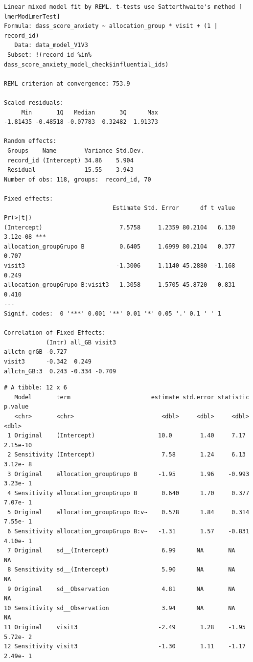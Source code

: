 \documentclass[
  letterpaper,
  DIV=11,
  numbers=noendperiod]{scrartcl}
\newenvironment{Shaded}{\begin{snugshade}}{\end{snugshade}}
\newcommand{\NormalTok}[1]{\textcolor[rgb]{0.00,0.23,0.31}{#1}}
\newcommand{\SpecialCharTok}[1]{\textcolor[rgb]{0.37,0.37,0.37}{#1}}
\begin{document}
\begin{verbatim}
Linear mixed model fit by REML. t-tests use Satterthwaite's method [
lmerModLmerTest]
Formula: dass_score_anxiety ~ allocation_group * visit + (1 | record_id)
   Data: data_model_V1V3
 Subset: !(record_id %in% dass_score_anxiety_model_check$influential_ids)

REML criterion at convergence: 753.9

Scaled residuals: 
     Min       1Q   Median       3Q      Max 
-1.81435 -0.48518 -0.07783  0.32482  1.91373 

Random effects:
 Groups    Name        Variance Std.Dev.
 record_id (Intercept) 34.86    5.904   
 Residual              15.55    3.943   
Number of obs: 118, groups:  record_id, 70

Fixed effects:
                               Estimate Std. Error      df t value Pr(>|t|)    
(Intercept)                      7.5758     1.2359 80.2104   6.130 3.12e-08 ***
allocation_groupGrupo B          0.6405     1.6999 80.2104   0.377    0.707    
visit3                          -1.3006     1.1140 45.2880  -1.168    0.249    
allocation_groupGrupo B:visit3  -1.3058     1.5705 45.8720  -0.831    0.410    
---
Signif. codes:  0 '***' 0.001 '**' 0.01 '*' 0.05 '.' 0.1 ' ' 1

Correlation of Fixed Effects:
            (Intr) all_GB visit3
allctn_grGB -0.727              
visit3      -0.342  0.249       
allctn_GB:3  0.243 -0.334 -0.709
\end{verbatim}

\begin{Shaded}
\end{Shaded}

\begin{verbatim}
# A tibble: 12 x 6
   Model       term                       estimate std.error statistic   p.value
   <chr>       <chr>                         <dbl>     <dbl>     <dbl>     <dbl>
 1 Original    (Intercept)                  10.0        1.40     7.17   2.15e-10
 2 Sensitivity (Intercept)                   7.58       1.24     6.13   3.12e- 8
 3 Original    allocation_groupGrupo B      -1.95       1.96    -0.993  3.23e- 1
 4 Sensitivity allocation_groupGrupo B       0.640      1.70     0.377  7.07e- 1
 5 Original    allocation_groupGrupo B:v~    0.578      1.84     0.314  7.55e- 1
 6 Sensitivity allocation_groupGrupo B:v~   -1.31       1.57    -0.831  4.10e- 1
 7 Original    sd__(Intercept)               6.99      NA       NA     NA       
 8 Sensitivity sd__(Intercept)               5.90      NA       NA     NA       
 9 Original    sd__Observation               4.81      NA       NA     NA       
10 Sensitivity sd__Observation               3.94      NA       NA     NA       
11 Original    visit3                       -2.49       1.28    -1.95   5.72e- 2
12 Sensitivity visit3                       -1.30       1.11    -1.17   2.49e- 1
\end{verbatim}
\end{document}
